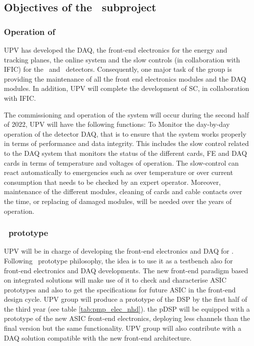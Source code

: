\subsection{Objectives of the \sUPV\ subproject}
\label{sec.obj.upv}
\subsubsection*{Operation of \Next}

UPV has developed the DAQ, the front-end electronics for the energy and tracking planes, the online system and the slow controls (in collaboration with IFIC) for the \NEW\ and \Next\ detectors. Consequently, one major task of the group is   providing the maintenance of all the front end electronics modules and the DAQ modules. In addition, UPV will complete the development of SC, in collaboration with IFIC. 

\indent
The commissioning and operation of the system will occur during the second half of 2022, UPV will have the following functions: To Monitor the day-by-day operation of the detector DAQ, that is to ensure that the system works properly in terms of performance and data integrity. This includes the slow control related to the DAQ system that monitors the status of the different cards, FE and DAQ cards in terms of temperature and voltages of operation. The slow-control can react automatically to emergencies such as over temperature or over current consumption that needs to be checked by an expert operator. Moreover, maintenance of the different modules, cleaning of cards and cable contacts over the time, or replacing of damaged modules, will be needed over the years of operation.


\subsubsection*{\HDEMO\ prototype}

\indent
UPV will be in charge of developing the front-end electronics and DAQ for \HDEMO.
Following \HDEMO\  prototype philosophy, the idea is to use it as a testbench also for front-end electronics and DAQ developments. The new front-end paradigm based on integrated solutions will make use of it to check and characterise ASIC prototypes and also to get the specifications for future ASIC in the front-end design cycle. UPV group will produce a prototype of the DSP by the first half of the third year (see table \ref{tab:pmp_elec_nhd}).  the pDSP will be equipped with a prototype of the new ASIC front-end electronics, deploying less channels than the final version but the same functionality. UPV group will also contribute with a DAQ solution compatible with the new front-end architecture.

